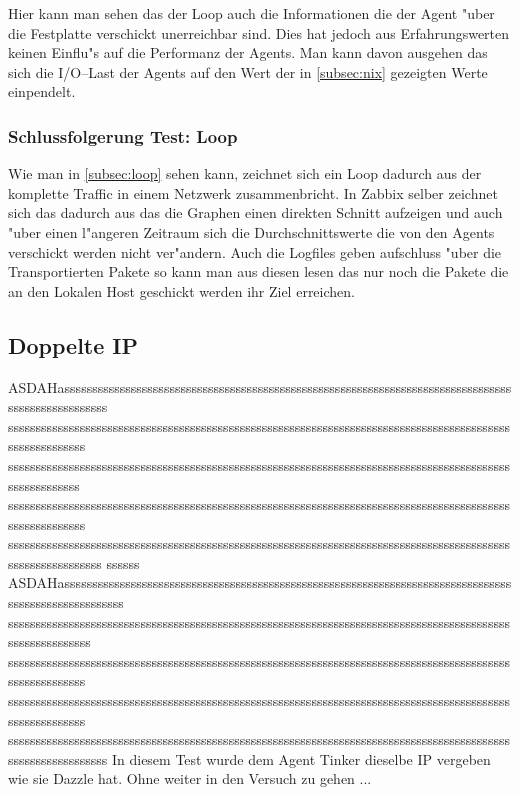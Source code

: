 Hier kann man sehen das der Loop auch die Informationen die der Agent "uber die Festplatte verschickt unerreichbar sind. Dies hat jedoch aus Erfahrungswerten keinen Einflu"s auf die %
Performanz der Agents. Man kann davon ausgehen das sich die I/O--Last der Agents auf den Wert der in \cref{subsec:nix} gezeigten Werte einpendelt. %


\subsubsection{Schlussfolgerung Test: Loop}
\label{subsubsec:schlussfolgerung:loop}

Wie man in \cref{subsec:loop} sehen kann, zeichnet sich ein Loop dadurch aus der komplette Traffic in einem Netzwerk zusammenbricht. In Zabbix selber zeichnet sich das %
dadurch aus das die Graphen einen direkten Schnitt aufzeigen und auch "uber einen l"angeren Zeitraum sich die Durchschnittswerte die von den Agents verschickt werden nicht %
ver"andern. Auch die Logfiles geben aufschluss "uber die Transportierten Pakete so kann man aus diesen lesen das nur noch die Pakete die an den Lokalen Host geschickt werden %
ihr Ziel erreichen.  


\subsection{Doppelte IP}
ASDAHasssssssssssssssssssssssssssssssssssssssssssssssssssssssssssssssssssssssssssssssssssssssssssssssssss
sssssssssssssssssssssssssssssssssssssssssssssssssssssssssssssssssssssssssssssssssssssssssssssssssssssssss
ssssssssssssssssssssssssssssssssssssssssssssssssssssssssssssssssssssssssssssssssssssssssssssssssssssssss
sssssssssssssssssssssssssssssssssssssssssssssssssssssssssssssssssssssssssssssssssssssssssssssssssssssssss
ssssssssssssssssssssssssssssssssssssssssssssssssssssssssssssssssssssssssssssssssssssssssssssssssssssssssssss
ssssss
ASDAHassssssssssssssssssssssssssssssssssssssssssssssssssssssssssssssssssssssssssssssssssssssssssssssssssssss
ssssssssssssssssssssssssssssssssssssssssssssssssssssssssssssssssssssssssssssssssssssssssssssssssssssssssss
sssssssssssssssssssssssssssssssssssssssssssssssssssssssssssssssssssssssssssssssssssssssssssssssssssssssss
sssssssssssssssssssssssssssssssssssssssssssssssssssssssssssssssssssssssssssssssssssssssssssssssssssssssss
sssssssssssssssssssssssssssssssssssssssssssssssssssssssssssssssssssssssssssssssssssssssssssssssssssssssssssss
In diesem Test wurde dem Agent Tinker dieselbe IP vergeben wie sie Dazzle hat. Ohne weiter in den Versuch zu gehen ...

